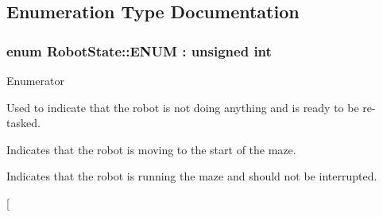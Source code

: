 \subsection{Enumeration Type Documentation}
\hypertarget{namespaceRobotState_a35861cd80d5e6a7efe93588700256f40}{
\subsubsection[{E\-N\-U\-M}]{\setlength{\rightskip}{0pt plus 5cm}enum {\bf Robot\-State\-::\-E\-N\-U\-M} \-: unsigned int}}\label{namespaceRobotState_a35861cd80d5e6a7efe93588700256f40}
\begin{Desc}
\item[Enumerator]\par
\begin{description}
\item[{\em 
\hypertarget{namespaceRobotState_a35861cd80d5e6a7efe93588700256f40a91b3fe8ec5cd16e28dc70cb3b28e8aea}{I\-D\-L\-E}\label{namespaceRobotState_a35861cd80d5e6a7efe93588700256f40a91b3fe8ec5cd16e28dc70cb3b28e8aea}
}]Used to indicate that the robot is not doing anything and is ready to be re-\/tasked. \item[{\em 
\hypertarget{namespaceRobotState_a35861cd80d5e6a7efe93588700256f40af7c91a1ca8daf629195b257b50e1b0b3}{M\-O\-V\-I\-N\-G\-\_\-\-T\-O\-\_\-\-S\-T\-A\-R\-T}\label{namespaceRobotState_a35861cd80d5e6a7efe93588700256f40af7c91a1ca8daf629195b257b50e1b0b3}
}]Indicates that the robot is moving to the start of the maze. \item[{\em 
\hypertarget{namespaceRobotState_a35861cd80d5e6a7efe93588700256f40a92eb5d5907ee22a4889e4c3c5af7e49b}{R\-U\-N\-N\-I\-N\-G\-\_\-\-M\-A\-Z\-E}\label{namespaceRobotState_a35861cd80d5e6a7efe93588700256f40a92eb5d5907ee22a4889e4c3c5af7e49b}
}]Indicates that the robot is running the maze and should not be interrupted. \item[{\em 
}
\end{description}
\end{Desc}
